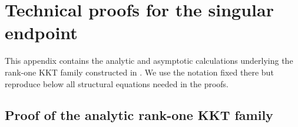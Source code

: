 \section{Technical proofs for the singular endpoint}
\label{app:endpoint-calculations}

This appendix contains the analytic and asymptotic calculations underlying
the rank-one KKT family constructed in
.  We use the notation fixed there but
reproduce below all structural equations needed in the proofs.

\subsection{Proof of the analytic rank-one KKT family}
\label{app:rank-one-kkt-family}

